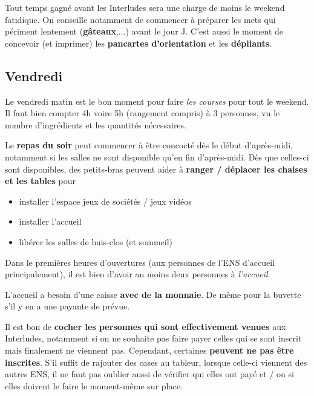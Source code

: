 Tout temps gagné avant les Interludes sera une charge de moins le weekend fatidique. On conseille notamment de commencer à préparer les mets qui périment lentement (\textbf{gâteaux},...) avant le jour J. C'est aussi le moment de concevoir (et imprimer) les \textbf{pancartes d'orientation} et les \textbf{dépliants}.

\subsection{Vendredi}

Le vendredi matin est le bon moment pour faire \emph{les courses} pour tout le weekend. Il faut bien compter 4h voire 5h (rangement compris) à 3 personnes, vu le nombre d'ingrédients et les quantités nécessaires.

Le \textbf{repas du soir} peut commencer à être concocté dès le début d'après-midi, notamment si les salles ne sont disponible qu'en fin d'après-midi. Dès que celles-ci sont disponibles, des petits-bras peuvent aider à \textbf{ranger / déplacer les chaises et les tables} pour
\begin{itemize}
    \item installer l'espace jeux de sociétés / jeux vidéos
    \item installer l'accueil
    \item libérer les salles de huis-clos (et sommeil)
\end{itemize}

Dans le premières heures d'ouvertures (aux personnes de l'ENS d'accueil principalement), il est bien d'avoir au moins deux personnes à \emph{l'accueil}.

\begin{Aanticiper}{}{}
L'accueil a besoin d'une caisse \textbf{avec de la monnaie}. De même pour la buvette s'il y en a une payante de prévue.
\end{Aanticiper}

\begin{Attention}{}{}
Il est bon de \textbf{cocher les personnes qui sont effectivement venues} aux Interludes, notamment si on ne souhaite pas faire payer celles qui se sont inscrit mais finalement ne viennent pas. Cependant, certaines \textbf{peuvent ne pas être inscrites}. S'il suffit de rajouter des cases au tableur, lorsque celle-ci viennent des autres ENS, il ne faut pas oublier aussi de vérifier qui elles ont payé et / ou si elles doivent le faire le moment-même sur place.
\end{Attention}


